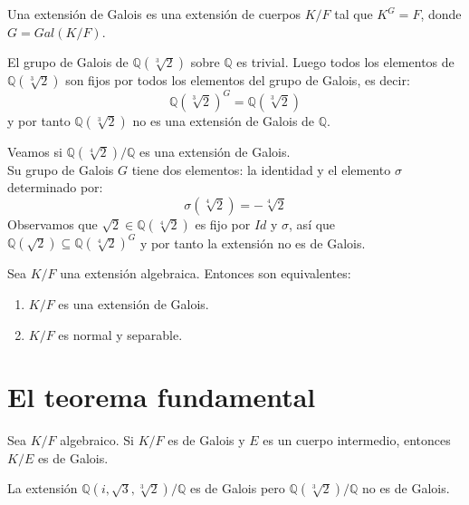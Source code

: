 \begin{definition}
    Una extensión de Galois es una extensión de cuerpos $K/F$ tal que $K^G = F$, donde $G = Gal(K/F)$.
\end{definition}

\begin{example}
    El grupo de Galois de $\mathbb{Q}(\sqrt[3]{2})$ sobre $\mathbb{Q}$ es trivial.
    Luego todos los elementos de $\mathbb{Q}(\sqrt[3]{2})$ son fijos por todos los elementos del grupo de Galois, es decir:
    $$\mathbb{Q}(\sqrt[3]{2})^G = \mathbb{Q}(\sqrt[3]{2})$$
    y por tanto $\mathbb{Q}(\sqrt[3]{2})$ no es una extensión de Galois de $\mathbb{Q}$.
\end{example}

\begin{example}
    Veamos si $\mathbb{Q}(\sqrt[4]{2})/\mathbb{Q}$ es una extensión de Galois.\\
    Su grupo de Galois $G$ tiene dos elementos: la identidad y el elemento $\sigma$ determinado por:
    $$\sigma(\sqrt[4]{2}) = -\sqrt[4]{2}$$
    Observamos que $\sqrt{2} \in \mathbb{Q}(\sqrt[4]{2})$ es fijo por $Id$ y $\sigma$, así que $\mathbb{Q}(\sqrt{2}) \subseteq \mathbb{Q}(\sqrt[4]{2})^G$ y por tanto la extensión no es de Galois.
\end{example}

\begin{theorem}
    Sea $K/F$ una extensión algebraica. Entonces son equivalentes:
    \begin{enumerate}
        \item $K/F$ es una extensión de Galois.
        \item $K/F$ es normal y separable.
    \end{enumerate}
\end{theorem}

\section{El teorema fundamental}

\begin{proposition}
    Sea $K/F$ algebraico. Si $K/F$ es de Galois y $E$ es un cuerpo intermedio, entonces $K/E$ es de Galois.
\end{proposition}

\begin{example}
    La extensión $\mathbb{Q}(i, \sqrt{3}, \sqrt[3]{2})/\mathbb{Q}$ es de Galois pero $\mathbb{Q}(\sqrt[3]{2})/\mathbb{Q}$ no es de Galois.
\end{example}

